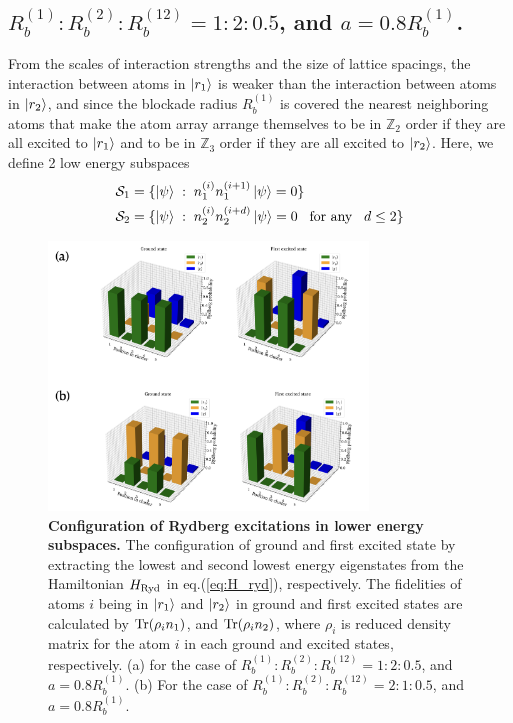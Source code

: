 \documentclass[%
 reprint,
nofootinbib,
 amsmath,amssymb,
 aps,
pra,
floatfix,
]{revtex4-2}
\begin{document}
\subsection{$R^{(1)}_b:R^{(2)}_b:R^{(12)}_b=1:2:0.5$, {\rm and} $a=0.8R^{(1)}_b$.} 
From the scales of interaction strengths and the size of lattice spacings, the interaction between atoms in $\ket{r_1}$ is weaker than the interaction between atoms in $\ket{r_2}$, and since the blockade radius $R^{(1)}_b$ is covered the nearest neighboring atoms that make the atom array arrange themselves to be in $\mathbb{Z}_2$ order if they are all excited to $\ket{r_1}$ and to be in $\mathbb{Z}_3$ order if they are all excited to $\ket{r_2}$. Here, we define 2 low energy subspaces 
\begin{align}\label{subspace_case1}
     & \mathcal{S}_1 = \{ \ket{\psi} \hspace{1mm} :\hspace{1mm} n^{(i)}_1 n^{(i+1)}_1 \ket{\psi} = 0  \} \nonumber \\
     & \mathcal{S}_2 = \{ \ket{\psi} \hspace{1mm} :\hspace{1mm} n^{(i)}_2 n^{(i+d)}_2 \ket{\psi} = 0 \hspace{3mm} \textit{\rm for any} \hspace{3mm} d \leq 2 \}
\end{align}
\begin{figure}[hbt!]
    \centering
    \includegraphics[width=8.5cm]{picture/case23_groundstate_barplot.png}
    \caption{\textbf{Configuration of Rydberg excitations in lower energy subspaces.} The configuration of ground and first excited state by extracting the lowest and second lowest energy eigenstates from the Hamiltonian $H_{\text{\rm Ryd}}$ in eq.(\ref{eq:H_ryd}), respectively. The fidelities of atoms $i$ being in $\ket{r_1}$ and $\ket{r_2}$ in ground and first excited states are calculated by $\textit{\rm Tr}(\rho_i n_1)$, and $\textit{\rm Tr}(\rho_i n_2)$, where $\rho_i$ is reduced density matrix for the atom $i$ in each ground and excited states, respectively. (a) for the case of $R^{(1)}_b:R^{(2)}_b:R^{(12)}_b=1:2:0.5$, and $a=0.8R^{(1)}_b$.  (b) For the case of  $R^{(1)}_b:R^{(2)}_b:R^{(12)}_b=2:1:0.5$, and $a=0.8R^{(1)}_b$.}
    \label{fig:case23_ground_barplot}
\end{figure}
\end{document}
